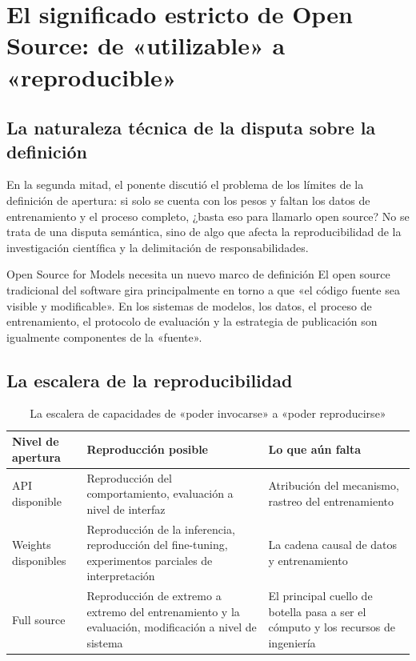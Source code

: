 \section{El significado estricto de Open Source: de «utilizable» a «reproducible»}

\subsection{La naturaleza técnica de la disputa sobre la definición}
En la segunda mitad, el ponente discutió el problema de los límites de la definición de apertura: si solo se cuenta con los pesos y faltan los datos de entrenamiento y el proceso completo, ¿basta eso para llamarlo open source? No se trata de una disputa semántica, sino de algo que afecta la reproducibilidad de la investigación científica y la delimitación de responsabilidades.

\begin{importantbox}{Open Source for Models necesita un nuevo marco de definición}
El open source tradicional del software gira principalmente en torno a que «el código fuente sea visible y modificable».  
En los sistemas de modelos, los datos, el proceso de entrenamiento, el protocolo de evaluación y la estrategia de publicación son igualmente componentes de la «fuente».
\end{importantbox}

\subsection{La escalera de la reproducibilidad}
\begin{table}[H]
\centering
\begin{tabular}{p{3.0cm}p{3.8cm}p{4.8cm}}
\toprule
\textbf{Nivel de apertura} & \textbf{Reproducción posible} & \textbf{Lo que aún falta} \\
\midrule
API disponible & Reproducción del comportamiento, evaluación a nivel de interfaz & Atribución del mecanismo, rastreo del entrenamiento \\
Weights disponibles & Reproducción de la inferencia, reproducción del fine-tuning, experimentos parciales de interpretación & La cadena causal de datos y entrenamiento \\
Full source & Reproducción de extremo a extremo del entrenamiento y la evaluación, modificación a nivel de sistema & El principal cuello de botella pasa a ser el cómputo y los recursos de ingeniería \\
\bottomrule
\end{tabular}
\caption{La escalera de capacidades de «poder invocarse» a «poder reproducirse»}
\end{table}

